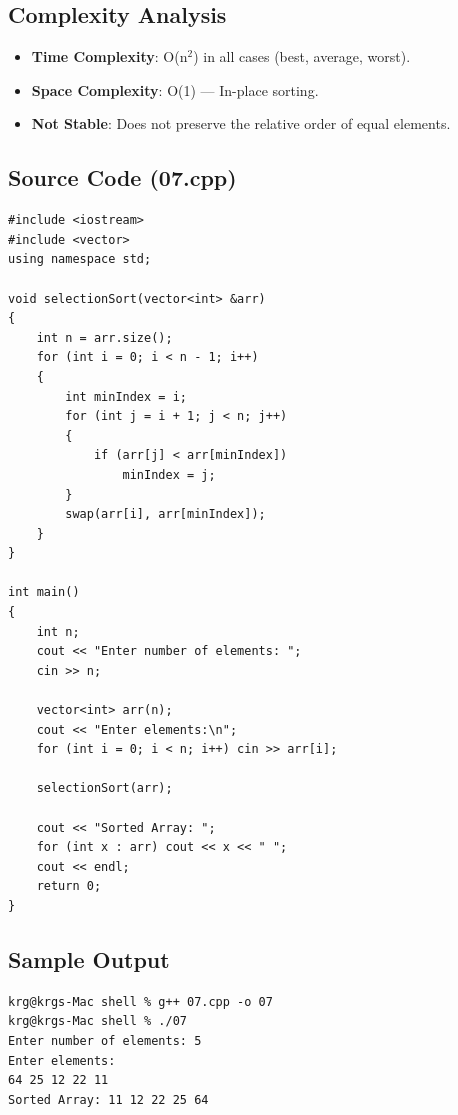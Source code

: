 \documentclass[a4paper,12pt]{article}
\begin{document}
\subsection*{Complexity Analysis}
\begin{itemize}
    \item \textbf{Time Complexity}: O(n$^2$) in all cases (best, average, worst).
    \item \textbf{Space Complexity}: O(1) — In-place sorting.
    \item \textbf{Not Stable}: Does not preserve the relative order of equal elements.
\end{itemize}

\subsection*{Source Code (07.cpp)}
\begin{lstlisting}[style=cppstyle]
#include <iostream>
#include <vector>
using namespace std;

void selectionSort(vector<int> &arr)
{
    int n = arr.size();
    for (int i = 0; i < n - 1; i++)
    {
        int minIndex = i;
        for (int j = i + 1; j < n; j++)
        {
            if (arr[j] < arr[minIndex])
                minIndex = j;
        }
        swap(arr[i], arr[minIndex]);
    }
}

int main()
{
    int n;
    cout << "Enter number of elements: ";
    cin >> n;

    vector<int> arr(n);
    cout << "Enter elements:\n";
    for (int i = 0; i < n; i++) cin >> arr[i];

    selectionSort(arr);

    cout << "Sorted Array: ";
    for (int x : arr) cout << x << " ";
    cout << endl;
    return 0;
}
\end{lstlisting}

\subsection*{Sample Output}
\begin{lstlisting}[style=outputstyle]
krg@krgs-Mac shell % g++ 07.cpp -o 07
krg@krgs-Mac shell % ./07
Enter number of elements: 5
Enter elements:
64 25 12 22 11
Sorted Array: 11 12 22 25 64
\end{lstlisting}

\newpage

\end{document}
